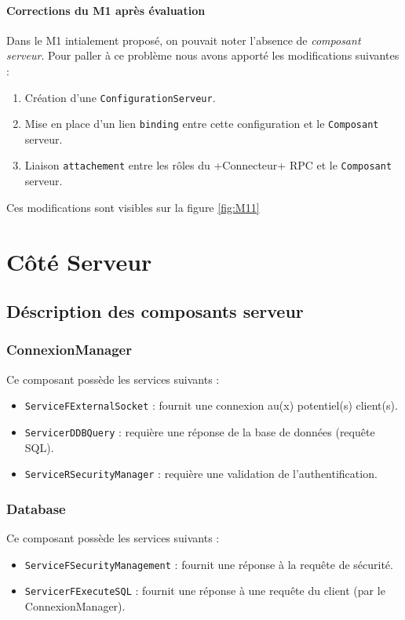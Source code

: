 \paragraph{Corrections du M1 après évaluation}
Dans le M1 intialement proposé, on pouvait noter l'absence de \textit{composant serveur}. Pour paller à ce problème nous avons apporté les modifications suivantes : 
\begin{enumerate}
\item Création d'une \verb+ConfigurationServeur+.
\item Mise en place d'un lien \verb+binding+ entre cette configuration et le \verb+Composant+ serveur.
\item Liaison \verb+attachement+ entre les rôles du  \ver+Connecteur+ RPC et le \verb+Composant+ serveur.
\end{enumerate}

Ces modifications sont visibles sur la figure \ref{fig:M11}

\section{Côté Serveur}
\subsection{Déscription des composants serveur}
\subsubsection{ConnexionManager}
Ce composant possède les services suivants : 
\begin{itemize}
\item 
  \verb+ServiceFExternalSocket+ : fournit une connexion au(x) potentiel(s) client(s).
\item 
  \verb+ServicerDDBQuery+ :  requière une réponse de la base de données (requête SQL).
\item 
  \verb+ServiceRSecurityManager+ :  requière une validation de l'authentification.
\end{itemize}

\subsubsection{Database}
Ce composant possède les services suivants : 
\begin{itemize}
\item 
  \verb+ServiceFSecurityManagement+ :  fournit une réponse à la requête de sécurité.
\item 
  \verb+ServicerFExecuteSQL+ :  fournit une réponse à une requête du client (par le ConnexionManager).
\end{itemize}

